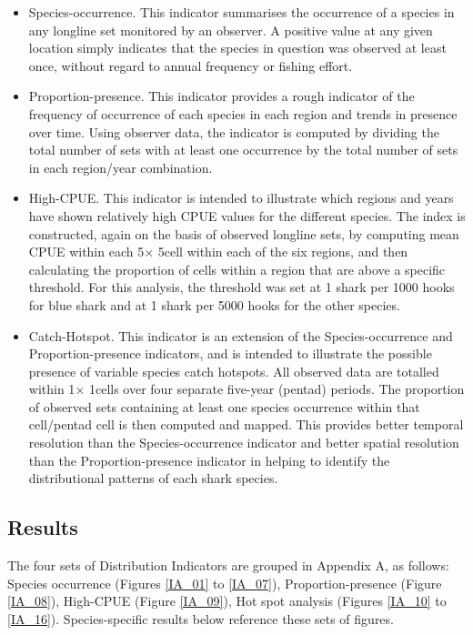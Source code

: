 \documentclass[12pt]{SCreport}
\begin{document}
\begin{itemize}
\item	Species-occurrence.  This indicator summarises the occurrence of a species in any longline set monitored by an observer.  A positive value at any given location simply indicates that the species in question was observed at least once, without regard to annual frequency or fishing effort.

\item	Proportion-presence.  This indicator provides a rough indicator of the frequency of occurrence of each species in each region and trends in presence over time.  Using observer data, the indicator is computed by dividing the total number of sets with at least one occurrence by the total number of sets in each region/year combination.
\item	High-CPUE.  This indicator is intended to illustrate which regions and years have shown relatively high CPUE values for the different species.  The index is constructed, again on the basis of observed longline sets, by computing mean CPUE within each 5\degree $\times$ 5\degree cell within each of the six regions, and then calculating the proportion of cells within a region that are above a specific threshold.  For this analysis, the threshold was set at 1 shark per 1000 hooks for blue shark and at 1 shark per 5000 hooks for the other species.
\item	Catch-Hotspot.  This indicator is an extension of the Species-occurrence and Proportion-presence indicators, and is intended to illustrate the possible presence of variable species catch hotspots.  All observed data are totalled within 1\degree $\times$ 1\degree cells over four separate five-year (pentad) periods.  The proportion of observed sets containing at least one species occurrence within that cell/pentad cell is then computed and mapped.  This provides better temporal resolution than the Species-occurrence indicator and better spatial resolution than the Proportion-presence indicator in helping to identify the distributional patterns of each shark species.
\end{itemize}



      \subsection{Results}
      The four sets of Distribution Indicators are grouped in Appendix A, as follows: Species occurrence (Figures \ref{IA_01} to \ref{IA_07}), Proportion-presence (Figure \ref{IA_08}), High-CPUE (Figure \ref{IA_09}), Hot spot analysis (Figures \ref{IA_10} to \ref{IA_16}).  Species-specific results below reference these sets of figures.
      
\end{document}
